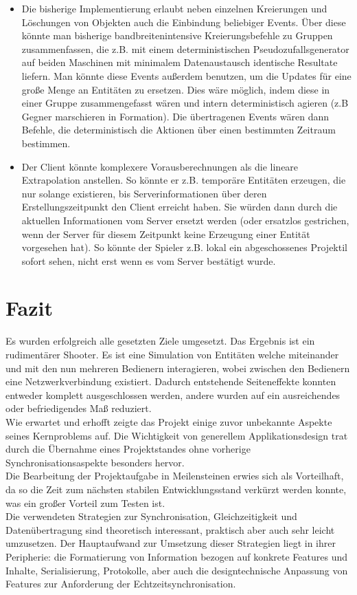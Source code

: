 \begin{itemize}
\item Die bisherige Implementierung erlaubt neben einzelnen Kreierungen und Löschungen von Objekten auch die Einbindung beliebiger Events. Über diese könnte man bisherige bandbreitenintensive Kreierungsbefehle zu Gruppen zusammenfassen, die z.B. mit einem deterministischen Pseudozufallsgenerator auf beiden Maschinen mit minimalem Datenaustausch identische Resultate liefern. Man könnte diese Events außerdem benutzen, um die Updates für eine große Menge an Entitäten zu ersetzen. Dies wäre möglich, indem diese in einer Gruppe zusammengefasst wären und intern deterministisch agieren (z.B Gegner marschieren in Formation). Die übertragenen Events wären dann Befehle, die deterministisch die Aktionen über einen bestimmten Zeitraum bestimmen.
\item Der Client könnte komplexere Vorausberechnungen als die lineare Extrapolation anstellen. So könnte er z.B. temporäre Entitäten erzeugen, die nur solange existieren, bis Serverinformationen über deren Erstellungszeitpunkt den Client erreicht haben. Sie würden dann durch die aktuellen Informationen vom Server ersetzt werden (oder ersatzlos gestrichen, wenn der Server für diesem Zeitpunkt keine Erzeugung einer Entität vorgesehen hat). So könnte der Spieler z.B. lokal ein abgeschossenes Projektil sofort sehen, nicht erst wenn es vom Server bestätigt wurde.
\end{itemize}

\section{Fazit}
Es wurden erfolgreich alle gesetzten Ziele umgesetzt. Das Ergebnis ist ein rudimentärer Shooter. Es ist eine Simulation von Entitäten welche miteinander und mit den nun mehreren Bedienern interagieren, wobei zwischen den Bedienern eine Netzwerkverbindung existiert. Dadurch entstehende Seiteneffekte konnten entweder  komplett ausgeschlossen werden, andere wurden auf ein ausreichendes oder befriedigendes Maß reduziert.\\
Wie erwartet und erhofft zeigte das Projekt einige zuvor unbekannte Aspekte seines Kernproblems auf. 
Die Wichtigkeit von generellem Applikationsdesign trat durch die Übernahme eines Projektstandes ohne vorherige Synchronisationsaspekte besonders hervor.\\
Die Bearbeitung der Projektaufgabe in Meilensteinen erwies sich als Vorteilhaft, da so die Zeit zum nächsten stabilen Entwicklungsstand verkürzt werden konnte, was ein großer Vorteil zum Testen ist.\\
Die verwendeten Strategien zur Synchronisation, Gleichzeitigkeit und Datenübertragung sind theoretisch interessant, praktisch aber auch sehr leicht umzusetzen. Der Hauptaufwand zur Umsetzung dieser Strategien liegt in ihrer Peripherie: die Formatierung von Information bezogen auf konkrete Features und Inhalte, Serialisierung, Protokolle, aber auch die designtechnische Anpassung von Features zur Anforderung der Echtzeitsynchronisation. 